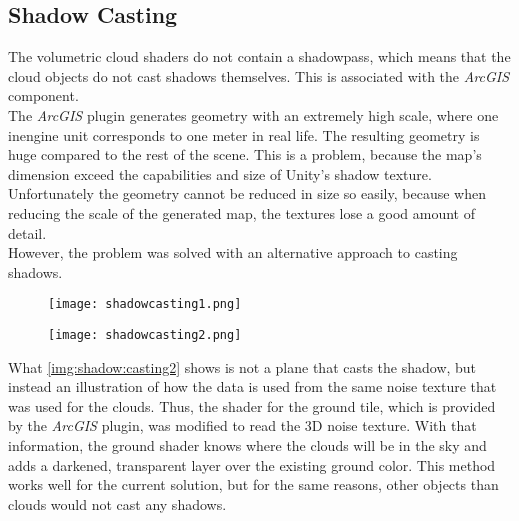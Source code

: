 \clearpage

\subsection{Shadow Casting}
\label{section:techimpl:shadow}
The \gls{volumetric} cloud \gls{shader}s do not contain a \gls{shadowpass}, which means that the cloud objects do not cast shadows themselves.
This is associated with the \emph{ArcGIS}  component.
\\
The \emph{ArcGIS} plugin generates geometry with an extremely high scale, where one \gls{inengine} unit corresponds to one meter in real life.
The resulting geometry is huge compared to the rest of the scene. This is a problem, because the map's dimension exceed the capabilities and size of Unity's shadow texture.
Unfortunately the geometry cannot be reduced in size so easily, because when reducing the scale of the generated map, the textures lose a good amount of detail.
\\
However, the problem was solved with an alternative approach to casting shadows.

\begin{figure}[H]
    \centering
        \begin{minipage}{0.47\linewidth}
            \texttt{[image: shadowcasting1.png]}
            \label{img:shadow:casting1}
        \end{minipage}
    \hfill
        \begin{minipage}{0.47\linewidth}
            \texttt{[image: shadowcasting2.png]}
            \label{img:shadow:casting2}
        \end{minipage}
\end{figure}

\noindent
What \autoref{img:shadow:casting2} shows is not a plane that casts the shadow, but instead an illustration of how the data is used from the same \gls{noise} texture that was used for the clouds.
Thus, the shader for the ground tile, which is provided by the \emph{ArcGIS} plugin, was modified to read the 3D \gls{noise} texture.
With that information, the ground shader knows where the clouds will be in the sky and adds a darkened, transparent layer over the existing ground color.
\emptyline
This method works well for the current solution, but for the same reasons, other objects than clouds would not cast any shadows.

